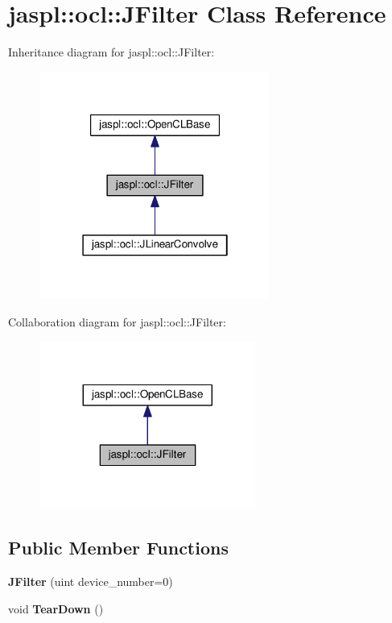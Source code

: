 \hypertarget{classjaspl_1_1ocl_1_1_j_filter}{}\section{jaspl\+:\+:ocl\+:\+:J\+Filter Class Reference}
\label{classjaspl_1_1ocl_1_1_j_filter}


Inheritance diagram for jaspl\+:\+:ocl\+:\+:J\+Filter\+:
\nopagebreak
\begin{figure}[H]
\begin{center}
\leavevmode
\includegraphics[width=214pt]{classjaspl_1_1ocl_1_1_j_filter__inherit__graph}
\end{center}
\end{figure}


Collaboration diagram for jaspl\+:\+:ocl\+:\+:J\+Filter\+:
\nopagebreak
\begin{figure}[H]
\begin{center}
\leavevmode
\includegraphics[width=200pt]{classjaspl_1_1ocl_1_1_j_filter__coll__graph}
\end{center}
\end{figure}
\subsection*{Public Member Functions}
\begin{DoxyCompactItemize}
\item 
{\bfseries J\+Filter} (uint device\+\_\+number=0)\hypertarget{classjaspl_1_1ocl_1_1_j_filter_a629f42e0ddb5afd768e158a50701efa5}{}\label{classjaspl_1_1ocl_1_1_j_filter_a629f42e0ddb5afd768e158a50701efa5}

\item 
void {\bfseries Tear\+Down} ()\hypertarget{classjaspl_1_1ocl_1_1_j_filter_a717b3afc56f8cf7125f54d7428d8323f}{}\label{classjaspl_1_1ocl_1_1_j_filter_a717b3afc56f8cf7125f54d7428d8323f}

\end{DoxyCompactItemize}
